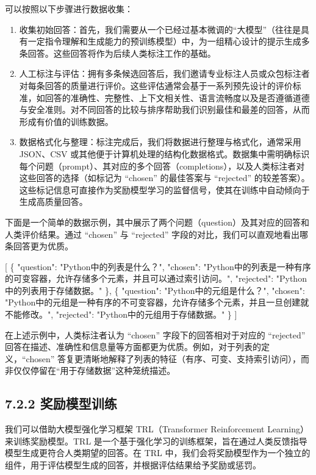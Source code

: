 \documentclass[
]{article}
\newenvironment{Shaded}{}{}
\newcommand{\DataTypeTok}[1]{\textcolor[rgb]{0.56,0.13,0.00}{#1}}
\newcommand{\FunctionTok}[1]{\textcolor[rgb]{0.02,0.16,0.49}{#1}}
\newcommand{\OtherTok}[1]{\textcolor[rgb]{0.00,0.44,0.13}{#1}}
\newcommand{\StringTok}[1]{\textcolor[rgb]{0.25,0.44,0.63}{#1}}
\begin{document}
可以按照以下步骤进行数据收集：

\begin{enumerate}
\def\labelenumi{\arabic{enumi}.}
\item
  收集初始回答：首先，我们需要从一个已经过基本微调的``大模型''（往往是具有一定指令理解和生成能力的预训练模型）中，为一组精心设计的提示生成多条回答。这些回答将作为后续人类标注工作的基础。
\item
  人工标注与评估：拥有多条候选回答后，我们邀请专业标注人员或众包标注者对每条回答的质量进行评价。这些评估通常会基于一系列预先设计的评价标准，如回答的准确性、完整性、上下文相关性、语言流畅度以及是否遵循道德与安全准则。对不同回答的比较与排序帮助我们识别最佳和最差的回答，从而形成有价值的训练数据。
\item
  数据格式化与整理：标注完成后，我们将数据进行整理与格式化，通常采用
  JSON、CSV
  或其他便于计算机处理的结构化数据格式。数据集中需明确标识每个问题（prompt）、其对应的多个回答（completions），以及人类标注者对这些回答的选择（如标记为
  ``chosen'' 的最佳答案与 ``rejected''
  的较差答案）。这些标记信息可直接作为奖励模型学习的监督信号，使其在训练中自动倾向于生成高质量回答。
\end{enumerate}

下面是一个简单的数据示例，其中展示了两个问题（question）及其对应的回答和人类评价结果。通过
``chosen'' 与 ``rejected''
字段的对比，我们可以直观地看出哪条回答更为优质。

\begin{Shaded}
\begin{Highlighting}[]
\OtherTok{[}
    \FunctionTok{\{}
        \DataTypeTok{"question"}\FunctionTok{:} \StringTok{"Python中的列表是什么？"}\FunctionTok{,}
        \DataTypeTok{"chosen"}\FunctionTok{:} \StringTok{"Python中的列表是一种有序的可变容器，允许存储多个元素，并且可以通过索引访问。"}\FunctionTok{,}
        \DataTypeTok{"rejected"}\FunctionTok{:} \StringTok{"Python中的列表用于存储数据。"}
    \FunctionTok{\}}\OtherTok{,}
    \FunctionTok{\{}
        \DataTypeTok{"question"}\FunctionTok{:} \StringTok{"Python中的元组是什么？"}\FunctionTok{,}
        \DataTypeTok{"chosen"}\FunctionTok{:} \StringTok{"Python中的元组是一种有序的不可变容器，允许存储多个元素，并且一旦创建就不能修改。"}\FunctionTok{,}
        \DataTypeTok{"rejected"}\FunctionTok{:} \StringTok{"Python中的元组用于存储数据。"}
    \FunctionTok{\}}
\OtherTok{]}
\end{Highlighting}
\end{Shaded}

在上述示例中，人类标注者认为 ``chosen'' 字段下的回答相对于对应的
``rejected''
回答在描述、准确性和信息量等方面都更为优质。例如，对于列表的定义，``chosen''
答复更清晰地解释了列表的特征（有序、可变、支持索引访问），而非仅仅停留在``用于存储数据''这种笼统描述。

\subsection{7.2.2
奖励模型训练}\label{ux5956ux52b1ux6a21ux578bux8badux7ec3}

我们可以借助大模型强化学习框架 TRL（Transformer Reinforcement
Learning）来训练奖励模型。TRL
是一个基于强化学习的训练框架，旨在通过人类反馈指导模型生成更符合人类期望的回答。在
TRL
中，我们会将奖励模型作为一个独立的组件，用于评估模型生成的回答，并根据评估结果给予奖励或惩罚。
\end{document}
